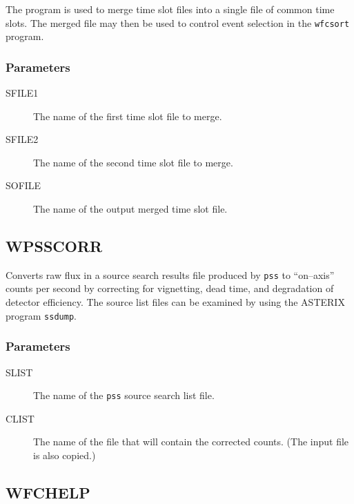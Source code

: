 The program is used to merge time slot files into a single file of common
time slots. The merged file may then be used to control event selection in
the {\tt wfcsort} program.

\subsubsection{Parameters}

\begin{description}

\item[SFILE1]
The name of the first time slot file to merge.

\item[SFILE2]
The name of the second time slot file to merge.

\item[SOFILE]
The name of the output merged time slot file.

\end{description}

\subsection{WPSSCORR}
\label{sec:programs:wpsscorr}

Converts raw flux in a source search results file produced by {\tt pss} to
``on--axis'' counts per second by correcting for vignetting, dead time,
and degradation of detector efficiency.  The source list files can be
examined by using the ASTERIX program {\tt ssdump}.

\subsubsection{Parameters}

\begin{description}

\item[SLIST]
The name of the {\tt pss} source search list file.

\item[CLIST]
The name of the file that will contain the corrected counts.  (The input
file is also copied.)

\end{description}

\subsection{WFCHELP}
\label{sec:programs:wfchelp}

